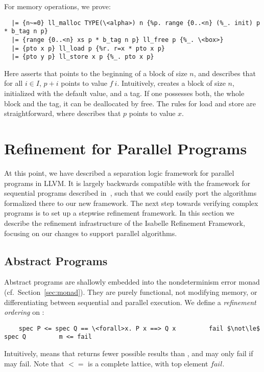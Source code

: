 \documentclass[a4paper,UKenglish,cleveref, autoref, thm-restate]{lipics-v2021}
\begin{document}
  For memory operations, we prove:
  \begin{lstlisting}
  |= {n~=0} ll_malloc TYPE(\<alpha>) n {%p. range {0..<n} (%_. init) p * b_tag n p}
  |= {range {0..<n} xs p * b_tag n p} ll_free p {%_. \<box>}
  |= {pto x p} ll_load p {%r. r=x * pto x p}
  |= {pto y p} ll_store x p {%_. pto x p}
  \end{lstlisting}
  Here  asserts that  points to the beginning of a block of size \is$n$, and
   describes that for all $i\in I$, $p+i$ points to value $f~i$.
  Intuitively,  creates a block of size $n$, initialized with the default  value,
  and a tag. If one possesses both, the whole block and the tag, it can be deallocated by free.
  The rules for load and store are straightforward, where  describes that $p$ points to value $x$.


  \section{Refinement for Parallel Programs}\label{sec:refine_parallel}
  At this point, we have described a separation logic framework for parallel programs in LLVM.
  It is largely backwards compatible with the framework for sequential programs described in~\cite{La19-llvm},
  such that we could easily port the algorithms formalized there to our new framework.
  The next step towards verifying complex programs is to set up a stepwise refinement framework.
  In this section we describe the refinement infrastructure of the
  Isabelle Refinement Framework, focusing on our changes to support parallel algorithms.

  \subsection{Abstract Programs}
  Abstract programs are shallowly embedded into the nondeterminism error monad  (cf.\ Section~\ref{sec:monad}).
  They are purely functional, not modifying memory, or differentiating between sequential and parallel execution.
  We define a \emph{refinement ordering} on :
  \begin{lstlisting}
    spec P <= spec Q == \<forall>x. P x ==> Q x         fail $\not\le$ spec Q         m <= fail
  \end{lstlisting}
  Intuitively,  means
  that  returns fewer possible results than , and may only fail if  may fail.
  Note that \is$<=$ is a complete lattice, with top element \is$fail$.
\end{document}
